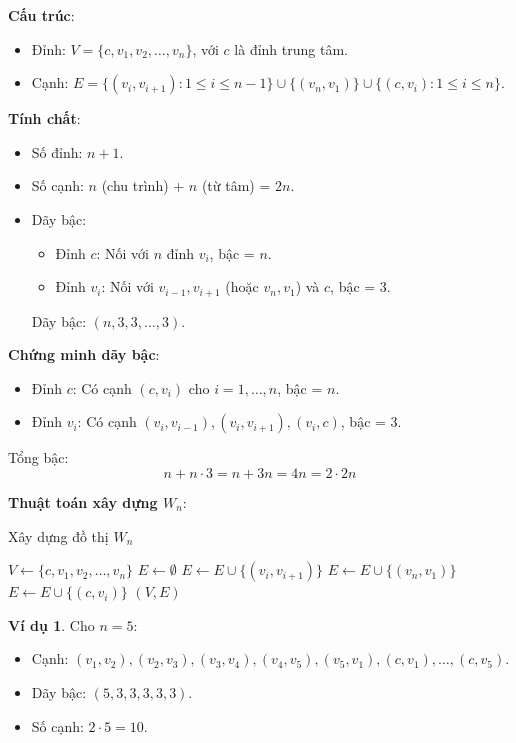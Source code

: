 \documentclass[a4paper,12pt]{article}
\theoremstyle{plain}
\theoremstyle{definition}
\newtheorem{example}{Ví dụ}
\begin{document}
\textbf{Cấu trúc}:
\begin{itemize}
    \item Đỉnh: \( V = \{c, v_1, v_2, \ldots, v_n\} \), với \( c \) là đỉnh trung tâm.
    \item Cạnh: \( E = \{(v_i, v_{i+1}) : 1 \leq i \leq n-1\} \cup \{(v_n, v_1)\} \cup \{(c, v_i) : 1 \leq i \leq n\} \).
\end{itemize}

\textbf{Tính chất}:
\begin{itemize}
    \item Số đỉnh: \( n+1 \).
    \item Số cạnh: \( n \) (chu trình) + \( n \) (từ tâm) = \( 2n \).
    \item Dãy bậc:
    \begin{itemize}
        \item Đỉnh \( c \): Nối với \( n \) đỉnh \( v_i \), bậc = \( n \).
        \item Đỉnh \( v_i \): Nối với \( v_{i-1}, v_{i+1} \) (hoặc \( v_n, v_1 \)) và \( c \), bậc = 3.
    \end{itemize}
    Dãy bậc: \( (n, 3, 3, \ldots, 3) \).
\end{itemize}

\textbf{Chứng minh dãy bậc}:
\begin{itemize}
    \item Đỉnh \( c \): Có cạnh \( (c, v_i) \) cho \( i=1,\ldots,n \), bậc = \( n \).
    \item Đỉnh \( v_i \): Có cạnh \( (v_i, v_{i-1}), (v_i, v_{i+1}), (v_i, c) \), bậc = 3.
\end{itemize}
Tổng bậc:
\[
n + n \cdot 3 = n + 3n = 4n = 2 \cdot 2n
\]

\textbf{Thuật toán xây dựng \( W_n \)}:
\begin{algorithm}
\caption{Xây dựng đồ thị \( W_n \)}
\begin{algorithmic}
    \State $V \gets \{c, v_1, v_2, \ldots, v_n\}$
    \State $E \gets \emptyset$
        \State $E \gets E \cup \{(v_i, v_{i+1})\}$
    \EndFor
    \State $E \gets E \cup \{(v_n, v_1)\}$
        \State $E \gets E \cup \{(c, v_i)\}$
    \EndFor
    \State \Return $(V, E)$
\EndFunction
\end{algorithmic}
\end{algorithm}

\begin{example}
Cho \( n=5 \):
\begin{itemize}
    \item Cạnh: \( (v_1, v_2), (v_2, v_3), (v_3, v_4), (v_4, v_5), (v_5, v_1), (c, v_1), \ldots, (c, v_5) \).
    \item Dãy bậc: \( (5, 3, 3, 3, 3, 3) \).
    \item Số cạnh: \( 2 \cdot 5 = 10 \).
\end{itemize}
\end{example}
\end{document}
